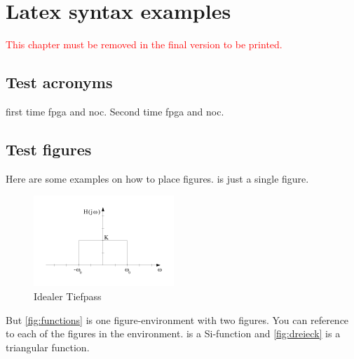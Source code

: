\chapter{Latex syntax examples}

\textcolor{red}{This chapter must be removed in the final version to be printed.}

\section{Test acronyms}

first time \gls{fpga} and \gls{noc}. Second time \gls{fpga} and \gls{noc}.


\section{Test figures}

Here are some examples on how to place figures.  is just a single figure.

\begin{figure}[htb]
	\centering
	\includegraphics[width=.5\linewidth]{figures/tiefpass.png}
	\caption{Idealer Tiefpass}
	\label{fig:tiefpass}
\end{figure}

But \cref{fig:functions} is one figure-environment with two figures. You can reference to each of the figures in the environment.  is a Si-function and \cref{fig:dreieck} is a triangular function.

